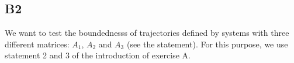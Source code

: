 \documentclass[11pt]{article}
\begin{document}
\begin{comment}
Solve \ref{C22} for $Z_{22} \in R^{n_{k}xn_{k}}$ using \ref{Y22} or \ref{vecY22} \\
Compute $C_{12}^{\sim}, C_{21}^{\sim}$ using \ref{C12sim} and \ref{C21sim} \\
Solve \ref{C12sim} and \ref{C21sim} for $Z_{12} \in R^{mxn_{k}}$ and $Z_{21} \in R^{n_{k}xm}$ using the lemme \ref{lemme} and \ref{vecpj} with p=j \\
Store Y(1:m,m+(1:$n_{k}$))=$Z_{12}$ \\
Store Y(m(1:$n_{k}$), 1:m) = $Z_{21}$ \\
Store Y(m+(1:$n_{k}$), m+(1:$n_{k}$))=$Z_{22}$ \\
Set $C = C_{11} - R_{12} Z_{21} - Z_{12} R_{12}^{T}$}\\
end
\Return{solution $P = U Y U^{*}$}
\caption{ }
\end{algorithm}
\end{comment}


\subsection*{B2}
We want to test the boundednesss of trajectories defined by systems with three different matrices: $A_1$, $A_2$ and $A_3$ (see the statement). For this purpose, we use statement 2 and 3 of the introduction of exercise A.
\end{document}

